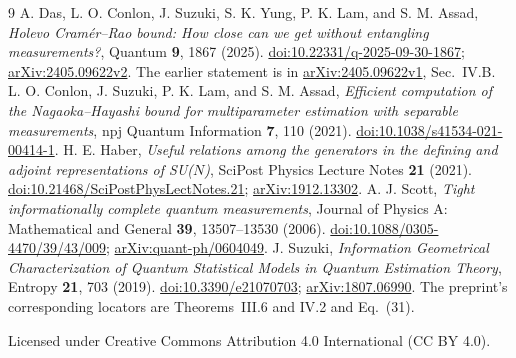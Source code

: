 \documentclass[11pt]{article}
\begin{document}
\begingroup\small
\begin{thebibliography}{9}
A. Das, L. O. Conlon, J. Suzuki, S. K. Yung, P. K. Lam, and S. M. Assad,
\emph{Holevo Cram\'er--Rao bound: How close can we get without entangling measurements?},
Quantum \textbf{9}, 1867 (2025).
\href{https://doi.org/10.22331/q-2025-09-30-1867}{doi:10.22331/q-2025-09-30-1867};
\href{https://arxiv.org/abs/2405.09622v2}{arXiv:2405.09622v2}.
The earlier statement is in
\href{https://arxiv.org/abs/2405.09622v1}{arXiv:2405.09622v1}, Sec.~IV.B.
L. O. Conlon, J. Suzuki, P. K. Lam, and S. M. Assad,
\emph{Efficient computation of the Nagaoka--Hayashi bound for multiparameter estimation with separable measurements},
npj Quantum Information \textbf{7}, 110 (2021).
\href{https://doi.org/10.1038/s41534-021-00414-1}{doi:10.1038/s41534-021-00414-1}.
H. E. Haber,
\emph{Useful relations among the generators in the defining and adjoint representations of SU($N$)},
SciPost Physics Lecture Notes \textbf{21} (2021).
\href{https://doi.org/10.21468/SciPostPhysLectNotes.21}{doi:10.21468/SciPostPhysLectNotes.21};
\href{https://arxiv.org/abs/1912.13302}{arXiv:1912.13302}.
A. J. Scott,
\emph{Tight informationally complete quantum measurements},
Journal of Physics A: Mathematical and General \textbf{39}, 13507--13530 (2006).
\href{https://doi.org/10.1088/0305-4470/39/43/009}{doi:10.1088/0305-4470/39/43/009};
\href{https://arxiv.org/abs/quant-ph/0604049}{arXiv:quant-ph/0604049}.
J. Suzuki,
\emph{Information Geometrical Characterization of Quantum Statistical Models in Quantum Estimation Theory},
Entropy \textbf{21}, 703 (2019).
\href{https://doi.org/10.3390/e21070703}{doi:10.3390/e21070703};
\href{https://arxiv.org/abs/1807.06990}{arXiv:1807.06990}.
The preprint's corresponding locators are Theorems~III.6 and IV.2 and Eq.~(31).
\end{thebibliography}
\endgroup
\smallskip\noindent\small
Licensed under Creative Commons Attribution 4.0 International (CC BY 4.0).
\end{document}

